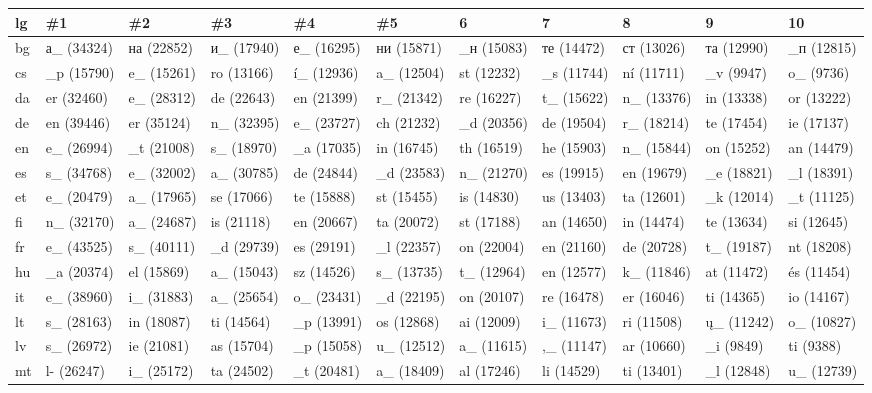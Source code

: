 \begin{tabular}{l|llllllllll}
lg&\#1&\#2&\#3&\#4&\#5&6&7&8&9&10\\
\hline
bg	&а_ (34324)	&на (22852)	&и_ (17940)	&е_ (16295)	&ни (15871)	&_н (15083)	&те (14472)	&ст (13026)	&та (12990)	&_п (12815)\\
cs	&_p (15790)	&e_ (15261)	&ro (13166)	&í_ (12936)	&a_ (12504)	&st (12232)	&_s (11744)	&ní (11711)	&_v (9947)	&o_ (9736)\\
da	&er (32460)	&e_ (28312)	&de (22643)	&en (21399)	&r_ (21342)	&re (16227)	&t_ (15622)	&n_ (13376)	&in (13338)	&or (13222)\\
de	&en (39446)	&er (35124)	&n_ (32395)	&e_ (23727)	&ch (21232)	&_d (20356)	&de (19504)	&r_ (18214)	&te (17454)	&ie (17137)\\
en	&e_ (26994)	&_t (21008)	&s_ (18970)	&_a (17035)	&in (16745)	&th (16519)	&he (15903)	&n_ (15844)	&on (15252)	&an (14479)\\
es	&s_ (34768)	&e_ (32002)	&a_ (30785)	&de (24844)	&_d (23583)	&n_ (21270)	&es (19915)	&en (19679)	&_e (18821)	&_l (18391)\\
et	&e_ (20479)	&a_ (17965)	&se (17066)	&te (15888)	&st (15455)	&is (14830)	&us (13403)	&ta (12601)	&_k (12014)	&_t (11125)\\
fi	&n_ (32170)	&a_ (24687)	&is (21118)	&en (20667)	&ta (20072)	&st (17188)	&an (14650)	&in (14474)	&te (13634)	&si (12645)\\
fr	&e_ (43525)	&s_ (40111)	&_d (29739)	&es (29191)	&_l (22357)	&on (22004)	&en (21160)	&de (20728)	&t_ (19187)	&nt (18208)\\
hu	&_a (20374)	&el (15869)	&a_ (15043)	&sz (14526)	&s_ (13735)	&t_ (12964)	&en (12577)	&k_ (11846)	&at (11472)	&és (11454)\\
it	&e_ (38960)	&i_ (31883)	&a_ (25654)	&o_ (23431)	&_d (22195)	&on (20107)	&re (16478)	&er (16046)	&ti (14365)	&io (14167)\\
lt	&s_ (28163)	&in (18087)	&ti (14564)	&_p (13991)	&os (12868)	&ai (12009)	&i_ (11673)	&ri (11508)	&ų_ (11242)	&o_ (10827)\\
lv	&s_ (26972)	&ie (21081)	&as (15704)	&_p (15058)	&u_ (12512)	&a_ (11615)	&,_ (11147)	&ar (10660)	&_i (9849)	&ti (9388)\\
mt	&l- (26247)	&i_ (25172)	&ta (24502)	&_t (20481)	&a_ (18409)	&al (17246)	&li (14529)	&ti (13401)	&_l (12848)	&u_ (12739)\\

\end{tabular}
